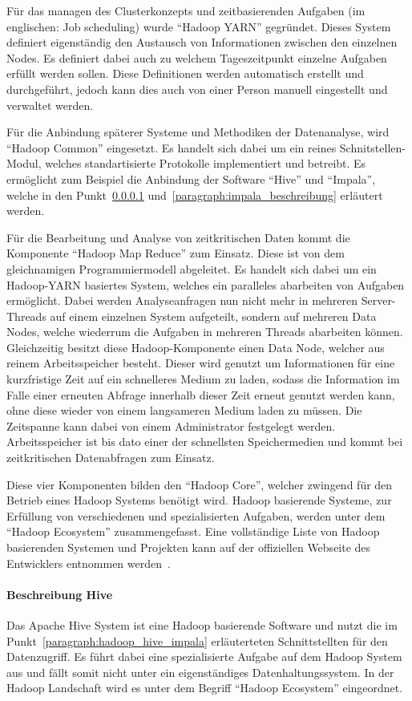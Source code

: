 Für das managen des Clusterkonzepts und zeitbasierenden Aufgaben (im
englischen: Job scheduling) wurde ``Hadoop YARN'' gegründet. Dieses System
definiert eigenständig den Austausch von Informationen zwischen den einzelnen
Nodes. Es definiert dabei auch zu welchem Tageszeitpunkt einzelne Aufgaben
erfüllt werden sollen. Diese Definitionen werden automatisch erstellt und
durchgeführt, jedoch kann dies auch von einer Person manuell eingestellt und
verwaltet werden.

Für die Anbindung späterer Systeme und Methodiken der Datenanalyse, wird
``Hadoop Common'' eingesetzt. Es handelt sich dabei um ein reines
Schnitstellen-Modul, welches standartisierte Protokolle implementiert und
betreibt. Es ermöglicht zum Beispiel die Anbindung der Software ``Hive'' und
``Impala'', welche in den Punkt~\ref{paragraph:hadoop_beschreibung}
und~\ref{paragraph:impala_beschreibung} erläutert werden.

Für die Bearbeitung und Analyse von zeitkritischen Daten kommt die Komponente
``Hadoop Map Reduce'' zum Einsatz. Diese ist von dem gleichnamigen
Programmiermodell abgeleitet. Es handelt sich dabei um ein Hadoop-YARN
basiertes System, welches ein paralleles abarbeiten von Aufgaben ermöglicht.
Dabei werden Analyseanfragen nun nicht mehr in mehreren Server-Threads auf
einem einzelnen System aufgeteilt, sondern auf mehreren Data Nodes, welche
wiederrum die Aufgaben in mehreren Threads abarbeiten können. Gleichzeitig
besitzt diese Hadoop-Komponente einen Data Node, welcher aus reinem
Arbeitsspeicher besteht. Dieser wird genutzt um Informationen für eine
kurzfristige Zeit auf ein schnelleres Medium zu laden, sodass die
Information im Falle einer erneuten Abfrage innerhalb dieser Zeit erneut
genutzt werden kann, ohne diese wieder von einem langsameren Medium laden
zu müssen. Die Zeitspanne kann dabei von einem Administrator festgelegt werden.
Arbeitsspeicher ist bis dato einer der schnellsten Speichermedien und kommt bei
zeitkritischen Datenabfragen zum Einsatz.

Diese vier Komponenten bilden den ``Hadoop Core'', welcher zwingend für den
Betrieb eines Hadoop Systems benötigt wird. Hadoop basierende Systeme, zur
Erfüllung von verschiedenen und spezialisierten Aufgaben, werden unter dem
``Hadoop Ecosystem'' zusammengefasst. Eine vollständige Liste von Hadoop
basierenden Systemen und Projekten kann auf der offiziellen Webseite des
Entwicklers entnommen werden~\cite{Hadoop_related_projects}.
\nl%

\paragraph{Beschreibung Hive}
\label{paragraph:hadoop_beschreibung}
Das Apache Hive System ist eine Hadoop basierende Software und nutzt die
im Punkt~\ref{paragraph:hadoop_hive_impala} erläuterteten Schnittstellten
für den Datenzugriff. Es führt dabei eine spezialisierte Aufgabe auf dem
Hadoop System aus und fällt somit nicht unter ein eigenständiges
Datenhaltungssystem. In der Hadoop Landschaft wird es unter dem Begriff
``Hadoop Ecosystem'' eingeordnet.

